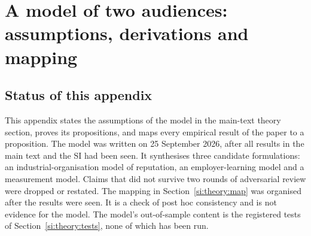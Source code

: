 \providecommand{\theoryprereg}{the docstring of \texttt{scripts/75\_theory\_tests.py} (public deposit pending;
the commit hash or DOI will be given here before any test is run)}
\section{A model of two audiences: assumptions, derivations and mapping}\label{si:theory}

\subsection*{Status of this appendix}

This appendix states the assumptions of the model in the main-text theory section, proves its propositions, and
maps every empirical result of the paper to a proposition. The model was written on 25 September 2026, after all
results in the main text and the SI had been seen. It synthesises three candidate formulations: an
industrial-organisation model of reputation, an employer-learning model and a measurement model. Claims that did
not survive two rounds of adversarial review were dropped or restated. The mapping in
Section~\ref{si:theory:map} was organised after the results were seen. It is a check of post hoc consistency and
is not evidence for the model. The model's out-of-sample content is the registered tests of
Section~\ref{si:theory:tests}, none of which has been run.

